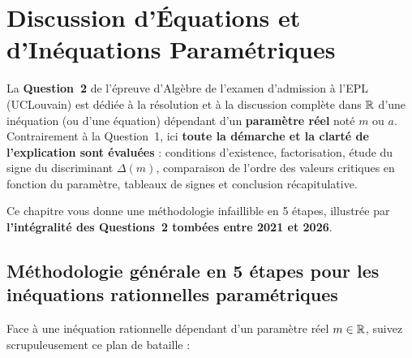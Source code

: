 \chapter{Discussion d'Équations et d'Inéquations Paramétriques}

La \textbf{Question~2} de l'épreuve d'Algèbre de l'examen d'admission à l'EPL (UCLouvain) est dédiée à la résolution et à la discussion complète dans $\mathbb{R}$ d'une inéquation (ou d'une équation) dépendant d'un \textbf{paramètre réel} noté $m$ ou $a$. Contrairement à la Question~1, ici \textbf{toute la démarche et la clarté de l'explication sont évaluées} : conditions d'existence, factorisation, étude du signe du discriminant $\Delta(m)$, comparaison de l'ordre des valeurs critiques en fonction du paramètre, tableaux de signes et conclusion récapitulative.

Ce chapitre vous donne une méthodologie infaillible en 5 étapes, illustrée par \textbf{l'intégralité des Questions~2 tombées entre 2021 et 2026}.

\section{Méthodologie générale en 5 étapes pour les inéquations rationnelles paramétriques}

Face à une inéquation rationnelle dépendant d'un paramètre réel $m \in \mathbb{R}$, suivez scrupuleusement ce plan de bataille :

